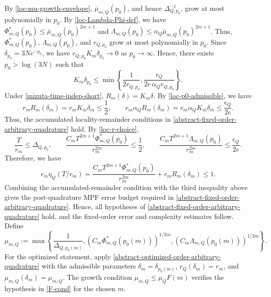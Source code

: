 \documentclass[10pt,reqno]{article}
\numberwithin{equation}{section}
\theoremstyle{plain}
\theoremstyle{definition}
\begin{document}
By \cref{loc-mu-growth-envelope}, \(\bar\mu_{m,Q}(p_0)\), and hence \(\Delta_{Q,p_0}^{-1}\), grow at most polynomially in \(p_0\). By \cref{loc-Lambda-Phi-def}, we have $\Phi_{m,Q}^{\ast}(p_0)\leq \bar\mu_{m,Q}(p_0)^{2m+1}$ and $\Lambda_{m,Q}(p_0)\leq \alpha_Q\bar\mu_{m,Q}(p_0)^{2m+1}$. Thus, \(\Phi_{m,Q}^{\ast}(p_0)\), \(\Lambda_{m,Q}(p_0)\), and \(r_{Q,p_0}\) grow at most polynomially in \(p_0\). Since \(\delta_{p_0}=3Ne^{-p_0}\), we have $r_{Q,p_0}K_m\delta_{p_0}\to 0$ as \(p_0\to\infty\). Hence, there exists \(p_0>\log(3N)\) such that
\begin{equation}\label{loc-p0-admissible}
K_m\delta_{p_0} \le \min\left\{ \frac{1}{2r_{Q,p_0}}, \frac{\epsilon_Q}{2e\,\alpha_Qr_{Q,p_0}} \right\}.
\end{equation}
Under \cref{mizuta-time-indep-short}, \(R_m(\delta)=K_m\delta\). By \cref{loc-p0-admissible}, we have
\begin{equation}
r_mR_m(\delta_m)=r_mK_m\delta_m\leq \frac12, \qquad r_m\alpha_QR_m(\delta_m)=r_m\alpha_QK_m\delta_m\leq \frac{\epsilon_Q}{2e}.
\end{equation}
Thus, the accumulated locality-remainder conditions in \cref{abstract-fixed-order-arbitrary-quadrature} hold. By \cref{loc-r-choice},
\begin{equation}
\frac{T}{r_m}\leq \Delta_{Q,p_0}, \qquad \frac{C_mT^{2m+1}\Phi_{m,Q}^{\ast}(p_0)}{r_m^{2m}}\leq \frac12, \qquad \frac{C_mT^{2m+1}\Lambda_{m,Q}(p_0)}{r_m^{2m}}\leq \frac{\epsilon_Q}{2e}.
\end{equation}
Therefore, we have
\begin{equation}
r_m\eta_Q(T/r_m) = \frac{C_mT^{2m+1}\Phi_{m,Q}^{\ast}(p_0)}{r_m^{2m}} + r_mR_m(\delta_m) \leq 1.
\end{equation}
Combining the accumulated-remainder condition with the third inequality above gives the post-quadrature MPF error budget required in \cref{abstract-fixed-order-arbitrary-quadrature}. Hence, all hypotheses of \cref{abstract-fixed-order-arbitrary-quadrature} hold, and the fixed-order error and complexity estimates follow. 
Define
\begin{equation}\label{loc-mu-mQ-def}
\mu_{m,Q} := \max\left\{ \frac{1}{\Delta_{Q,p_0(m)}}, ( C_m\Phi_{m,Q}^{\ast}(p_0(m)) )^{1/2m}, \left( C_m \Lambda_{m,Q}(p_0(m)) \right)^{1/2m} \right\}.
\end{equation}
For the optimized statement, apply \cref{abstract-optimized-order-arbitrary-quadrature} with the admissible parameters \(\delta_m=\delta_{p_0(m)}\), \(r_Q(\delta_m)=r_m\), and \(\mu_{m,Q}(\delta_m)=\mu_{m,Q}\). The growth condition \(\mu_{m,Q}\leq \mu_QF(m)\) verifies the hypothesis in \cref{F-cond} for the chosen $m$.
\end{document}
